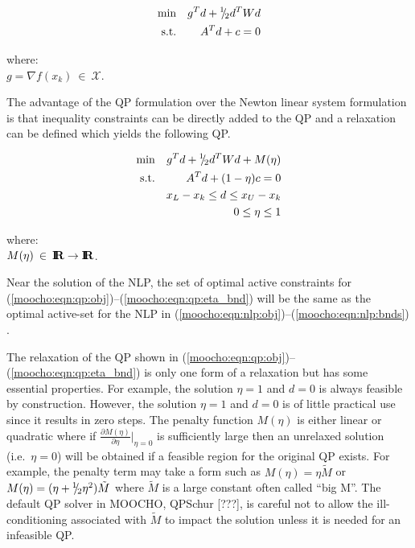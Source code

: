 \documentclass[pdf,ps2pdf,11pt]{SANDreport}
\begin{document}
{\bsinglespace
\begin{eqnarray}
\mbox{min}  &  & g^T d + {}^1 \!\! / \! {}_2 d^T W d   \label{moocho:eqn:qp_newton:obj} \\
\mbox{s.t.} &  & A^T d + c = 0                \label{moocho:eqn:qp_newton:equ}
\end{eqnarray}
\begin{tabbing}
\hspace{4ex}where:\hspace{5ex}\= \\
\>	$g = \nabla f(x_k) \:\in\:\mathcal{X}.$
\end{tabbing}
\esinglespace}

The advantage of the QP formulation over the Newton linear system formulation
is that inequality constraints can be directly added to the QP and a
relaxation can be defined which yields the following QP.

{\bsinglespace
\begin{eqnarray}
\mbox{min}  &  & g^T d + {}^1 \!\! / \! {}_2 d^T W d + M(\eta)                   \label{moocho:eqn:qp:obj} \\
\mbox{s.t.} &  & A^T d + (1-\eta) c = 0                                 \label{moocho:eqn:qp:equ} \\
            &  & x_L - x_k \leq d \leq x_U -x_k                         \label{moocho:eqn:qp:bnds} \\
            &  & 0 \leq \eta \leq 1                                     \label{moocho:eqn:qp:eta_bnd}
\end{eqnarray}
\begin{tabbing}
\hspace{4ex}where:\hspace{5ex}\= \\
\>	$M(\eta) \:\in\:\mbox{\textbf{I}}\hspace{-0.6ex}\mbox{\textbf{R}} \rightarrow \mbox{\textbf{I}}\hspace{-0.6ex}\mbox{\textbf{R}}$.
\end{tabbing}
\esinglespace}

Near the solution of the NLP, the set of optimal active constraints for
(\ref{moocho:eqn:qp:obj})--(\ref{moocho:eqn:qp:eta_bnd}) will be the same as
the optimal active-set for the NLP in
(\ref{moocho:eqn:nlp:obj})--(\ref{moocho:eqn:nlp:bnds}) {}\cite[Theorem
18.1]{ref:nocedal_wright_1999}.

The relaxation of the QP shown in
(\ref{moocho:eqn:qp:obj})--(\ref{moocho:eqn:qp:eta_bnd}) is only one form of a
relaxation but has some essential properties.  For example, the solution $\eta
= 1$ and $d = 0$ is always feasible by construction.  However, the solution
$\eta = 1$ and $d = 0$ is of little practical use since it results in zero
steps.  The penalty function $M(\eta)$ is either linear or quadratic where if
$\frac{\partial M(\eta)}{\partial {}\eta}|_{\eta = 0}$ is sufficiently large
then an unrelaxed solution (i.e.\ $\eta = 0$) will be obtained if a feasible
region for the original QP exists.  For example, the penalty term may take a
form such as $M(\eta) = {}\eta \tilde{M}$ or $M(\eta) = (\eta + {}{}^1 \!\! / \! {}_2
{}\eta^2)\tilde{M}$ where $\tilde{M}$ is a large constant often called ``big
M''.  The default QP solver in MOOCHO, QPSchur [???], is careful not to allow
the ill-conditioning associated with $\tilde{M}$ to impact the solution unless
it is needed for an infeasible QP.
\end{document}
